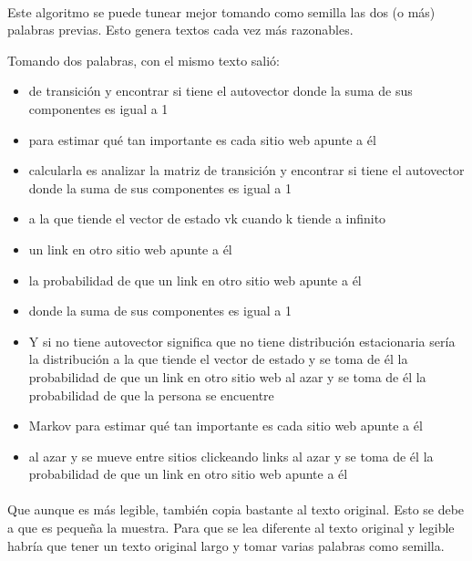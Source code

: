 \documentclass[../main.tex]{subfiles}
\begin{document}
\paragraph{} Este algoritmo se puede tunear mejor tomando como semilla las dos (o más) palabras previas. Esto genera textos cada vez más razonables.

Tomando dos palabras, con el mismo texto salió:

\begin{itemize}
  \item de transición y encontrar si tiene el autovector donde la suma de sus componentes es igual a 1
  \item para estimar qué tan importante es cada sitio web apunte a él
  \item calcularla es analizar la matriz de transición y encontrar si tiene el autovector donde la suma de sus componentes es igual a 1
  \item a la que tiende el vector de estado vk cuando k tiende a infinito
  \item un link en otro sitio web apunte a él
  \item la probabilidad de que un link en otro sitio web apunte a él
  \item donde la suma de sus componentes es igual a 1
  \item Y si no tiene autovector significa que no tiene distribución estacionaria sería la distribución a la que tiende el vector de estado y se toma de él la probabilidad de que un link en otro sitio web al azar y se toma de él la probabilidad de que la persona se encuentre
  \item Markov para estimar qué tan importante es cada sitio web apunte a él
  \item al azar y se mueve entre sitios clickeando links al azar y se toma de él la probabilidad de que un link en otro sitio web apunte a él
\end{itemize}

\paragraph{} Que aunque es más legible, también copia bastante al texto original. Esto se debe a que es pequeña la muestra. Para que se lea diferente al texto original y legible habría que tener un texto original largo y tomar varias palabras como semilla.
\end{document}

